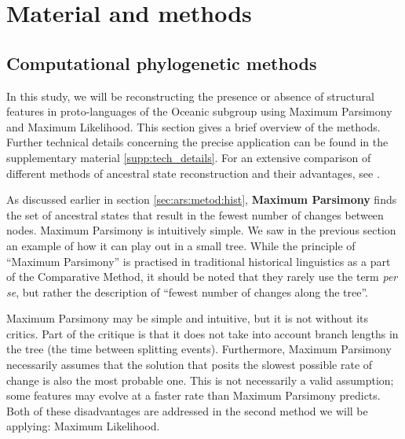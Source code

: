 \documentclass[a4paper,10pt]{article} %
\begin{document}

\section{Material and methods}
\subsection{Computational phylogenetic methods}
\label{sec:asr_methods}

In this study, we will be reconstructing the presence or absence of structural features in proto-languages of the Oceanic subgroup using Maximum Parsimony and Maximum Likelihood. This section gives a brief overview of the methods. Further technical details concerning the precise application can be found in the supplementary material \ref{supp:tech_details}. For an extensive comparison of different methods of ancestral state reconstruction and their advantages, see \citet{joy2016ancestral}.

As discussed earlier in section \ref{sec:ars:metod:hist}, \textbf{Maximum Parsimony} finds the set of ancestral states that result in the fewest number of changes between nodes. Maximum Parsimony is intuitively simple. We saw in the previous section an example of how it can play out in a small tree. While the principle of ``Maximum Parsimony'' is practised in traditional historical linguistics as a part of the Comparative Method, it should be noted that they rarely use the term \emph{per se}, but rather the description of ``fewest number of changes along the tree''.

Maximum Parsimony may be simple and intuitive, but it is not without its critics. Part of the critique is that it does not take into account branch lengths in the tree (the time between splitting events). Furthermore, Maximum Parsimony necessarily assumes that the solution that posits the slowest possible rate of change is also the most probable one. This is not necessarily a valid assumption; some features may evolve at a faster rate than Maximum Parsimony predicts. Both of these disadvantages are addressed in the second method we will be applying: Maximum Likelihood.
\end{document}
